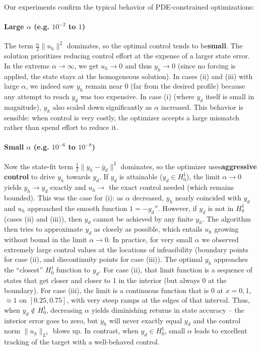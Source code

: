 \documentclass[a4paper,10pt]{report}
\begin{document}
Our experiments confirm the typical behavior of PDE-constrained optimizations:

\paragraph{Large \(\alpha\) (e.g. \(10^{-2}\) to \(1\))}
The term \(\frac{\alpha}{2}\|u_h\|^2\) dominates, so the optimal control tends to be\textbf{small}. The solution prioritizes reducing control effort at the expense of a larger state error. In the extreme \(\alpha\to\infty\), we get \(u_h\to 0\) and thus \(y_h\to 0\) (since no forcing is applied, the state stays at the homogeneous solution). In cases (ii) and (iii) with large \(\alpha\), we indeed saw \(y_h\) remain near 0 (far from the desired profile) because any attempt to reach \(y_d\) was too expensive. In case (i) (where \(y_d\) itself is small in magnitude), \(y_h\) also scaled down significantly as \(\alpha\) increased. This behavior is sensible: when control is very costly, the optimizer accepts a large mismatch rather than spend effort to reduce it.
\paragraph{Small \(\alpha\) (e.g. \(10^{-6}\) to \(10^{-8}\))}
Now the state-fit term \(\frac{1}{2}\|y_h-\bar y_d\|^2\) dominates, so the optimizer uses\textbf{aggressive control} to drive \(y_h\) towards \(y_d\). If \(y_d\) is attainable (\(y_d\in H^1_0\)), the limit \(\alpha\to 0\) yields \(y_h \to y_d\) exactly and \(u_h \to\) the exact control needed (which remains bounded). This was the case for (i): as \(\alpha\) decreased, \(y_h\) nearly coincided with \(y_d\) and \(u_h\) approached the smooth function \(1 = -y_d''\). However, if \(y_d\) is not in \(H^1_0\) (cases (ii) and (iii)), then \(y_d\) cannot be achieved by any finite \(y_h\). The algorithm then tries to approximate \(y_d\) as closely as possible, which entails \(u_h\) growing without bound in the limit \(\alpha\to 0\). In practice, for very small \(\alpha\) we observed extremely large control values at the locations of infeasibility (boundary points for case (ii), and discontinuity points for case (iii)). The optimal \(y_h\) approaches the “closest” \(H^1_0\) function to \(y_d\). For case (ii), that limit function is a sequence of states that get closer and closer to 1 in the interior (but always 0 at the boundary). For case (iii), the limit is a continuous function that is 0 at \(x=0,1\), \(\approx 1\) on \([0.25,0.75]\), with very steep ramps at the edges of that interval. Thus, when \(y_d \notin H^1_0\), decreasing \(\alpha\) yields diminishing returns in state accuracy – the interior error goes to zero, but \(y_h\) will never exactly equal \(y_d\) and the control norm \(\|u_h\|_{L^2}\) blows up. In contrast, when \(y_d\in H^1_0\), small \(\alpha\) leads to excellent tracking of the target with a well-behaved control.
\end{document}
